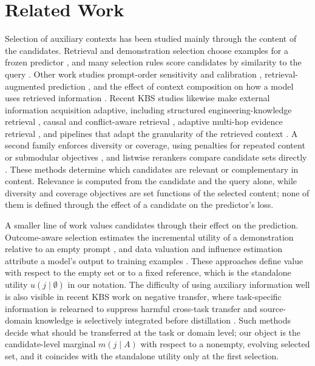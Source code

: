 \section{Related Work}

Selection of auxiliary contexts has been studied mainly through the content of
the candidates. Retrieval and demonstration selection choose examples for a
frozen predictor \citep{brown2020language,min2022rethinking}, and many
selection rules score candidates by similarity to the query
\citep{liu2022what,rubin2022learning,zhang2022active,su2023selective}. Other
work studies prompt-order sensitivity and calibration
\citep{lu2022fantastically,zhao2021calibrate}, retrieval-augmented prediction
\citep{guu2020realm,lewis2020retrieval,karpukhin2020dense,borgeaud2022improving,izacard2023atlas,shi2024replug,asai2024selfrag},
and the effect of context composition on how a model uses retrieved
information \citep{liu2024lost}. Recent KBS studies likewise make external
information acquisition adaptive, including structured engineering-knowledge
retrieval \citep{siddharth2024retrieval}, causal and conflict-aware retrieval
\citep{crgs2026causal}, adaptive multi-hop evidence retrieval
\citep{acra2025retrieval}, and pipelines that adapt the granularity of the
retrieved context \citep{morenocediel2026optimising}. A second family enforces
diversity or
coverage, using penalties for repeated content or submodular objectives
\citep{carbonell1998use,gupta-etal-2023-coverage,levy2023diverse}, and listwise
rerankers compare candidate sets directly
\citep{nogueira2019passage,ma2023zero,qin2024large,sachan2022improving}. These
methods determine which candidates are relevant or complementary in content.
Relevance is computed from the candidate and the query alone, while diversity
and coverage objectives are set functions of the selected content; none of them
is defined through the effect of a candidate on the predictor's loss.

A smaller line of work values candidates through their effect on the
prediction. Outcome-aware selection estimates the incremental utility of a
demonstration relative to an empty prompt \citep{hashimoto-etal-2024-take}, and
data valuation and influence estimation attribute a model's output to training
examples
\citep{ghorbani2019data,koh2017understanding,pruthi2020estimating,ilyas2022datamodels}.
These approaches define value with respect to the empty set or to a fixed
reference, which is the standalone utility $u(j\mid\emptyset)$ in our
notation. The difficulty of using auxiliary information well is also visible in
recent KBS work on negative transfer, where task-specific information is
relearned to suppress harmful cross-task transfer \citep{ant2025negative} and
source-domain knowledge is selectively integrated before distillation
\citep{liang2026parameter}. Such methods decide what should be transferred at the task
or domain level; our object is the candidate-level marginal $m(j\mid A)$ with
respect to a nonempty, evolving selected set, and it coincides with the
standalone utility only at the first selection.


